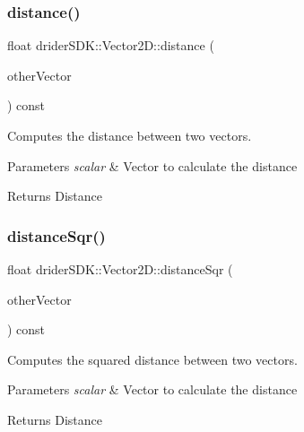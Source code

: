 \subsubsection{\texorpdfstring{distance()}{distance()}}
{\footnotesize\ttfamily float drider\+S\+D\+K\+::\+Vector2\+D\+::distance (\begin{DoxyParamCaption}\item[{const \hyperlink{classdrider_s_d_k_1_1_vector2_d}{Vector2D} \&}]{other\+Vector }\end{DoxyParamCaption}) const}

Computes the distance between two vectors.


\begin{DoxyParams}{Parameters}
{\em scalar} & Vector to calculate the distance\\
\hline
\end{DoxyParams}
\begin{DoxyReturn}{Returns}
Distance 
\end{DoxyReturn}
\mbox{\label{classdrider_s_d_k_1_1_vector2_d_aed36b461864f39075e5b21547a0c2c9a}} 
\subsubsection{\texorpdfstring{distance\+Sqr()}{distanceSqr()}}
{\footnotesize\ttfamily float drider\+S\+D\+K\+::\+Vector2\+D\+::distance\+Sqr (\begin{DoxyParamCaption}\item[{const \hyperlink{classdrider_s_d_k_1_1_vector2_d}{Vector2D} \&}]{other\+Vector }\end{DoxyParamCaption}) const}

Computes the squared distance between two vectors.


\begin{DoxyParams}{Parameters}
{\em scalar} & Vector to calculate the distance\\
\hline
\end{DoxyParams}
\begin{DoxyReturn}{Returns}
Distance 
\end{DoxyReturn}
\mbox{\label{classdrider_s_d_k_1_1_vector2_d_af12eaa67f2debd35b66eda9964017d93}} 
